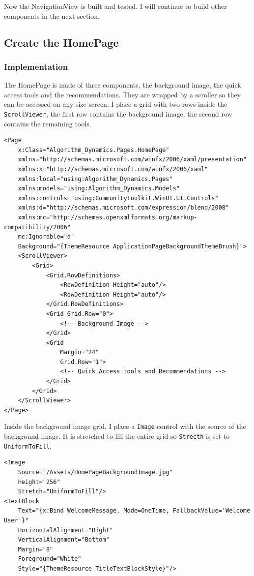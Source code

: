 \documentclass[a4paper]{report}
\begin{document}
Now the NavigationView is built and tested. I will continue to build other components in the next section.

\subsection{Create the HomePage}

\subsubsection{Implementation}

The HomePage is made of three components, the background image, the quick access tools and the recommendations. They are wrapped by a scroller so they can be accessed on any size screen. I place a grid with two rows inside the \verb|ScrollViewer|, the first row contains the background image, the second row contains the remaining tools. 

\begin{verbatim}
<Page
    x:Class="Algorithm_Dynamics.Pages.HomePage"
    xmlns="http://schemas.microsoft.com/winfx/2006/xaml/presentation"
    xmlns:x="http://schemas.microsoft.com/winfx/2006/xaml"
    xmlns:local="using:Algorithm_Dynamics.Pages"
    xmlns:models="using:Algorithm_Dynamics.Models"
    xmlns:controls="using:CommunityToolkit.WinUI.UI.Controls"
    xmlns:d="http://schemas.microsoft.com/expression/blend/2008"
    xmlns:mc="http://schemas.openxmlformats.org/markup-compatibility/2006"
    mc:Ignorable="d"
    Background="{ThemeResource ApplicationPageBackgroundThemeBrush}">
    <ScrollViewer>
        <Grid>
            <Grid.RowDefinitions>
                <RowDefinition Height="auto"/>
                <RowDefinition Height="auto"/>
            </Grid.RowDefinitions>
            <Grid Grid.Row="0">
                <!-- Background Image -->
            </Grid>
            <Grid 
                Margin="24"
                Grid.Row="1">
                <!-- Quick Access tools and Recommendations -->
            </Grid>
        </Grid>
    </ScrollViewer>
</Page>
\end{verbatim}

Inside the background image grid, I place a \verb|Image| control with the source of the background image. It is stretched to fill the entire grid so \verb|Strecth| is set to \verb|UniformToFill|.

\begin{verbatim}
<Image 
    Source="/Assets/HomePageBackgroundImage.jpg" 
    Height="256"
    Stretch="UniformToFill"/>
<TextBlock 
    Text="{x:Bind WelcomeMessage, Mode=OneTime, FallbackValue='Welcome User'}"
    HorizontalAlignment="Right"
    VerticalAlignment="Bottom"
    Margin="8"
    Foreground="White"
    Style="{ThemeResource TitleTextBlockStyle}"/>
\end{verbatim}
\end{document}

